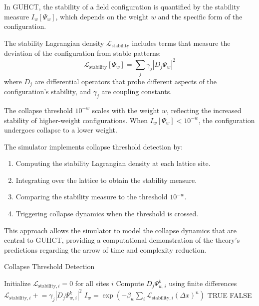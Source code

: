 \documentclass[11pt,a4paper]{article}
\makeatletter
\renewenvironment{proof}[1][\proofname]{\par
  \pushQED{\qed}%
  \normalfont \topsep6\p@\@plus6\p@\relax
  \trivlist
  \item[\hskip\labelsep
        \itshape
    #1\@addpunct{.}]\ignorespaces
}{%
  \popQED\endtrivlist\@endpefalse
}
\makeatother
\begin{document}
\begin{proof}
In GUHCT, the stability of a field configuration is quantified by the stability measure $I_w[\Psi_w]$, which depends on the weight $w$ and the specific form of the configuration.

The stability Lagrangian density $\mathcal{L}_{\text{stability}}$ includes terms that measure the deviation of the configuration from stable patterns:
\begin{equation}
\mathcal{L}_{\text{stability}}[\Psi_w] = \sum_j \gamma_j |D_j \Psi_w|^2
\end{equation}
where $D_j$ are differential operators that probe different aspects of the configuration's stability, and $\gamma_j$ are coupling constants.

The collapse threshold $10^{-w}$ scales with the weight $w$, reflecting the increased stability of higher-weight configurations. When $I_w[\Psi_w] < 10^{-w}$, the configuration undergoes collapse to a lower weight.

The simulator implements collapse threshold detection by:
\begin{enumerate}
    \item Computing the stability Lagrangian density at each lattice site.
    \item Integrating over the lattice to obtain the stability measure.
    \item Comparing the stability measure to the threshold $10^{-w}$.
    \item Triggering collapse dynamics when the threshold is crossed.
\end{enumerate}

This approach allows the simulator to model the collapse dynamics that are central to GUHCT, providing a computational demonstration of the theory's predictions regarding the arrow of time and complexity reduction.
\end{proof}

\begin{algorithm}
\caption{Collapse Threshold Detection}
\label{alg:collapse_threshold}
\begin{algorithmic}[1]
    \State Initialize $\mathcal{L}_{\text{stability},i} = 0$ for all sites $i$
            \State Compute $D_j \Psi_{w,i}^k$ using finite differences
            \State $\mathcal{L}_{\text{stability},i} \mathrel{+}= \gamma_j |D_j \Psi_{w,i}^k|^2$
        \EndFor
    \EndFor
    \State $I_w = \exp\left(-\beta_w \sum_i \mathcal{L}_{\text{stability},i} (\Delta x)^n\right)$
        \State \Return TRUE 
    \Else
        \State \Return FALSE
    \EndIf
\EndProcedure
\end{algorithmic}
\end{algorithm}
\end{document}
